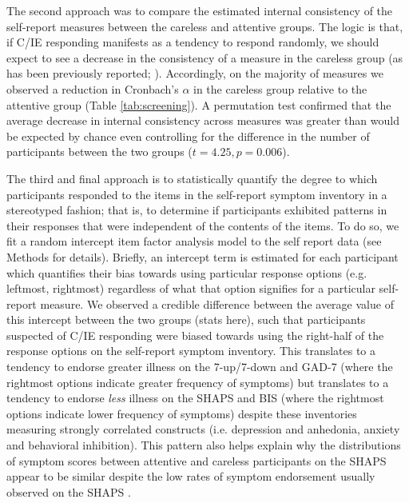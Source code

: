 \documentclass[a4paper,notitlepage,12pt]{article}
\begin{document}
The second approach was to compare the estimated internal consistency of the self-report measures between the careless and attentive groups. The logic is that, if C/IE responding manifests as a tendency to respond randomly, we should expect to see a decrease in the consistency of a measure in the careless group (as has been previously reported; \cite{maniaci2014caring, desimone2018dirty, desimone2018differential}). Accordingly, on the majority of measures we observed a reduction in Cronbach's $\alpha$ in the careless group relative to the attentive group (Table \ref{tab:screening}). A permutation test confirmed that the average decrease in internal consistency across measures was greater than would be expected by chance even controlling for the difference in the number of participants between the two groups ($t = 4.25, p = 0.006$). 

The third and final approach is to statistically quantify the degree to which participants responded to the items in the self-report symptom inventory in a stereotyped fashion; that is, to determine if participants exhibited patterns in their responses that were independent of the contents of the items. To do so, we fit a random intercept item factor analysis model \cite{maydeu2006random} to the self report data (see Methods for details). Briefly, an intercept term is estimated for each participant which quantifies their bias towards using particular response options (e.g. leftmost, rightmost) regardless of what that option signifies for a particular self-report measure. We observed a credible difference between the average value of this intercept between the two groups (stats here), such that participants suspected of C/IE responding were biased towards using the right-half of the response options on the self-report symptom inventory. This translates to a tendency to endorse greater illness on the 7-up/7-down and GAD-7 (where the rightmost options indicate greater frequency of symptoms) but translates to a tendency to endorse \emph{less} illness on the SHAPS and BIS (where the rightmost options indicate lower frequency of symptoms) despite these inventories measuring strongly correlated constructs (i.e. depression and anhedonia, anxiety and behavioral inhibition). This pattern also helps explain why the distributions of symptom scores between attentive and careless participants on the SHAPS appear to be similar despite the low rates of symptom endorsement usually observed on the SHAPS \cite{snaith1995scale}.
\end{document}

